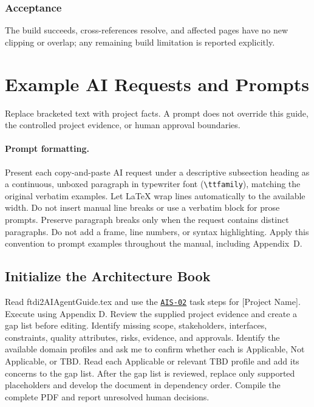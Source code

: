 \subsubsection*{Acceptance}
\label{Section:AIBuildAcceptance}
The build succeeds, cross-references resolve, and affected pages have no new clipping or overlap; any remaining build limitation is reported explicitly.

\section{Example AI Requests and Prompts}
\label{Section:AIExamplePrompts}
Replace bracketed text with project facts. A prompt does not override this
guide, the controlled project evidence, or human approval boundaries.

\paragraph{Prompt formatting.}\label{Section:AIPromptFormatting}
Present each copy-and-paste AI request under a descriptive subsection heading
as a continuous, unboxed paragraph in typewriter font (\texttt{\textbackslash ttfamily}), matching the original
verbatim examples.
Let LaTeX wrap lines automatically to the available width. Do not insert manual
line breaks or use a verbatim block for prose prompts. Preserve paragraph
breaks only when the request contains distinct paragraphs. Do not add a frame,
line numbers, or syntax highlighting. Apply this convention
to prompt examples throughout the manual, including Appendix~D.

\subsection{Initialize the Architecture Book}
\label{Section:AIInitializePrompt}
\begingroup\ttfamily\raggedright
\noindent Read ftdi2AIAgentGuide.tex and use the \hyperref[Skill:AIS-02]{\texttt{AIS-02}} task steps for [Project Name]. Execute using Appendix D. Review the supplied project evidence and create a gap list before editing. Identify missing scope, stakeholders, interfaces, constraints, quality attributes, risks, evidence, and approvals. Identify the available domain profiles and ask me to confirm whether each is Applicable, Not Applicable, or TBD. Read each Applicable or relevant TBD profile and add its concerns to the gap list. After the gap list is reviewed, replace only supported placeholders and develop the document in dependency order. Compile the complete PDF and report unresolved human decisions.\par
\endgroup


